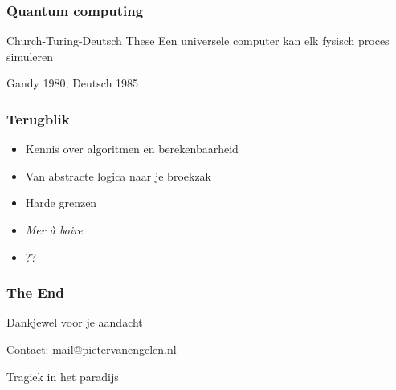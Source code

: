 \documentclass{beamer}
\begin{document}
\begin{frame}{}
    \frametitle{Quantum computing}
    \begin{block}{Church-Turing-Deutsch These}
        Een universele computer kan elk fysisch proces simuleren
        
        {\small Gandy 1980, Deutsch 1985}
    \end{block}

\end{frame}

\begin{frame}{}
    \frametitle{Terugblik}
    \begin{itemize}
        \item<2-> Kennis over algoritmen en berekenbaarheid
        \item<3-> Van abstracte logica naar je broekzak
        \item<4-> Harde grenzen
        \item<5-> \emph{Mer à boire}
        \item<6-> ?? 
    \end{itemize}
\end{frame}

\begin{frame}{}
    \frametitle{The End}

    {\LARGE Dankjewel voor je aandacht}
    
    \vspace{3cm}

    Contact: mail@pietervanengelen.nl
\end{frame}

\begin{frame}
    \begin{center}
        {\LARGE Tragiek in het paradijs}
    \end{center}
\end{frame}
\end{document}
